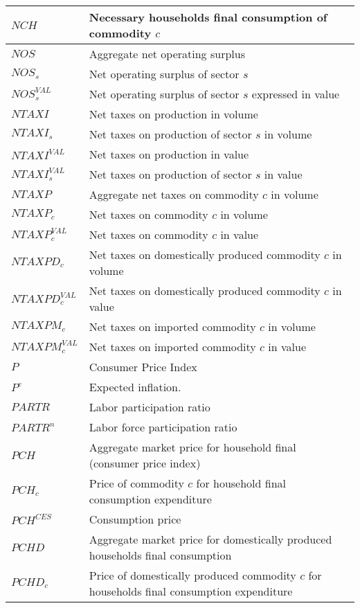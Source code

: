 \documentclass[12pt]{article}
\numberwithin{equation}{section}
\begin{document}
\begin{longtable}{@{}p{4cm}p{9cm}@{}}
 \midrule 
$NCH$ & Necessary households final consumption of commodity $c$ \\
 \midrule 
$NOS$ & Aggregate net operating surplus \\
 \midrule 
$NOS_{s}$ & Net operating surplus of sector $s$ \\
 \midrule 
$NOS^{VAL}_{s}$ & Net operating surplus of sector $s$ expressed in value \\
 \midrule 
$NTAXI$ & Net taxes on production in volume \\
 \midrule 
$NTAXI_{s}$ & Net taxes on production of sector $s$ in volume \\
 \midrule 
$NTAXI^{VAL}$ & Net taxes on production in value \\
 \midrule 
$NTAXI^{VAL}_{s}$ & Net taxes on production of sector $s$ in value \\
 \midrule 
$NTAXP$ & Aggregate net taxes on commodity $c$ in volume \\
 \midrule 
$NTAXP_{c}$ & Net taxes on commodity $c$ in volume \\
 \midrule 
$NTAXP^{VAL}_{c}$ & Net taxes on commodity $c$ in value \\
 \midrule 
$NTAXPD_{c}$ & Net taxes on domestically produced commodity $c$ in volume \\
 \midrule 
$NTAXPD^{VAL}_{c}$ & Net taxes on domestically produced commodity $c$ in value \\
 \midrule 
$NTAXPM_{c}$ & Net taxes on imported commodity $c$ in volume \\
 \midrule 
$NTAXPM^{VAL}_{c}$ & Net taxes on imported commodity $c$ in value \\
 \midrule 
$P$ & Consumer Price Index \\
 \midrule 
$P^{e}$ & Expected inflation. \\
 \midrule 
$PARTR$ & Labor participation ratio \\
 \midrule 
$PARTR^{n}$ & Labor force participation ratio \\
 \midrule 
$PCH$ & Aggregate market price for household final (consumer price index) \\
 \midrule 
$PCH_{c}$ & Price of commodity $c$ for household final consumption expenditure \\
 \midrule 
$PCH^{CES}$ & Consumption price \\
 \midrule 
$PCHD$ & Aggregate market price for domestically produced households final consumption \\
 \midrule 
$PCHD_{c}$ & Price of domestically produced commodity $c$ for households final consumption expenditure \\

\end{longtable}
\end{document}
